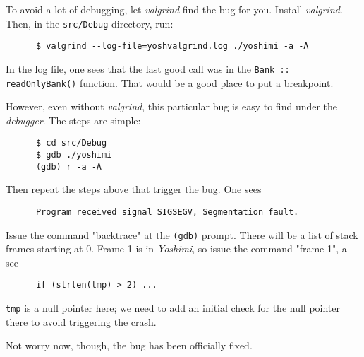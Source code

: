    To avoid a lot of debugging, let \textsl{valgrind} find the bug for you.
   Install \textsl{valgrind}.  Then, in the \texttt{src/Debug} directory,
   run:

   \begin{verbatim}
      $ valgrind --log-file=yoshvalgrind.log ./yoshimi -a -A
   \end{verbatim}

   In the log file, one sees that the last good call was in the
   \texttt{Bank :: readOnlyBank()} function.  That would be a good place to
   put a breakpoint.

   However, even without \textsl{valgrind}, this particular bug is easy to
   find under the \textsl{debugger}.  The steps are simple:

   \begin{verbatim}
      $ cd src/Debug
      $ gdb ./yoshimi
      (gdb) r -a -A
   \end{verbatim}

   Then repeat the steps above that trigger the bug.
   One sees

   \begin{verbatim}
      Program received signal SIGSEGV, Segmentation fault.
   \end{verbatim}

   Issue the command "backtrace" at the \texttt{(gdb)} prompt.  There will
   be a list of stack frames starting at 0.  Frame 1 is in \textsl{Yoshimi},
   so issue the command "frame 1", a see

   \begin{verbatim}
      if (strlen(tmp) > 2) ...
   \end{verbatim}

   \texttt{tmp} is a null pointer here; we need to add an initial check for
   the null pointer there to avoid triggering the crash.

   Not worry now, though, the bug has been officially fixed.


